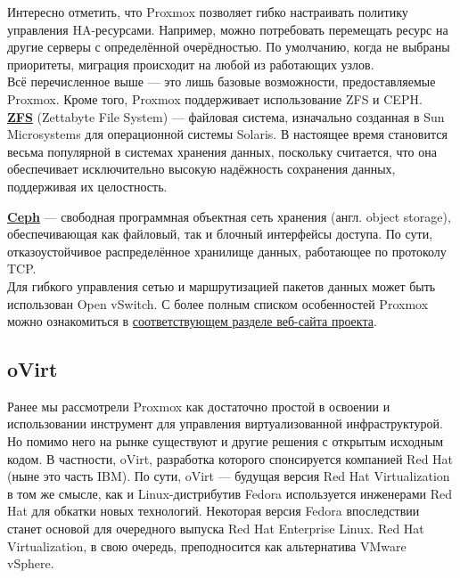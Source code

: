 \documentclass[14pt, a4paper]{article}
\begin{document}
Интересно отметить, что Proxmox позволяет гибко настраивать политику управления HA-ресурсами.
Например, можно потребовать перемещать ресурс на другие серверы с определённой очерёдностью.
По умолчанию, когда не выбраны приоритеты, миграция происходит на любой из работающих узлов.\\

Всё перечисленное выше — это лишь базовые возможности, предоставляемые Proxmox. Кроме того,
Proxmox поддерживает использование ZFS и CEPH.\\

\href{https://ru.wikipedia.org/wiki/ZFS}{\textbf{ZFS}} (Zettabyte File System) — файловая система, изначально созданная в Sun Microsystems для
операционной системы Solaris. В настоящее время становится весьма популярной в системах
хранения данных, поскольку считается, что она обеспечивает исключительно высокую надёжность
сохранения данных, поддерживая их целостность.

\href{https://ru.wikipedia.org/wiki/Ceph}{\textbf{Ceph}} — свободная программная объектная сеть хранения (англ. object storage), обеспечивающая как
файловый, так и блочный интерфейсы доступа. По сути, отказоустойчивое распределённое
хранилище данных, работающее по протоколу TCP.\\

Для гибкого управления сетью и маршрутизацией пакетов данных может быть использован Open
vSwitch. С более полным списком особенностей Proxmox можно ознакомиться в \href{https://www.proxmox.com/en/proxmox-ve/features}{соответствующем
разделе веб-сайта проекта}.

\subsection*{oVirt} 

Ранее мы рассмотрели Proxmox как достаточно простой в освоении и использовании инструмент для
управления виртуализованной инфраструктурой. Но помимо него на рынке существуют и другие
решения с открытым исходным кодом. В частности, oVirt, разработка которого спонсируется
компанией Red Hat (ныне это часть IBM). По сути, oVirt — будущая версия Red Hat Virtualization в том
же смысле, как и Linux-дистрибутив Fedora используется инженерами Red Hat для обкатки новых
технологий. Некоторая версия Fedora впоследствии станет основой для очередного выпуска Red Hat
Enterprise Linux. Red Hat Virtualization, в свою очередь, преподносится как альтернатива VMware
vSphere.\\
\end{document}
